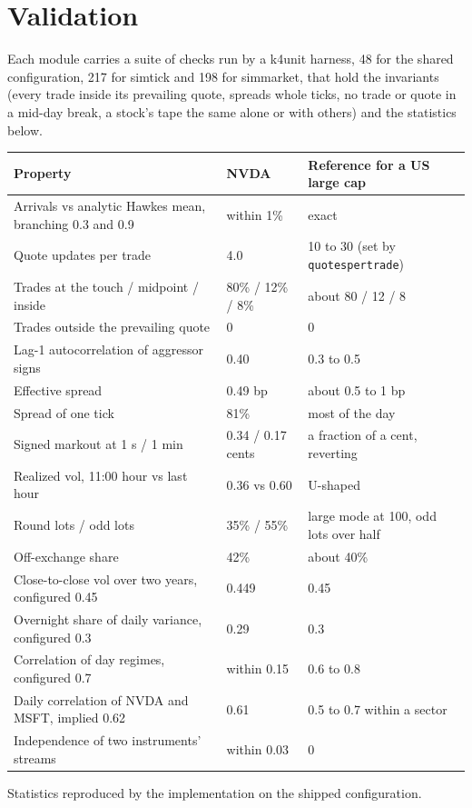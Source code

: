 \documentclass[11pt,a4paper]{article}
\newcommand{\key}[1]{\texttt{#1}}
\theoremstyle{paper}
\begin{document}
\section{Validation}

Each module carries a suite of checks run by a k4unit harness, 48 for the shared configuration, 217 for simtick and 198 for simmarket, that hold the invariants (every trade inside its prevailing quote, spreads whole ticks, no trade or quote in a mid-day break, a stock's tape the same alone or with others) and the statistics below.

\begin{center}
\small
\begin{tabularx}{\linewidth}{@{}Xll@{}}
\toprule
\textbf{Property} & \textbf{NVDA} & \textbf{Reference for a US large cap}\\
\midrule
Arrivals vs analytic Hawkes mean, branching 0.3 and 0.9 & within 1\% & exact\\
Quote updates per trade & 4.0 & 10 to 30 (set by \key{quotespertrade})\\
Trades at the touch / midpoint / inside & 80\% / 12\% / 8\% & about 80 / 12 / 8\\
Trades outside the prevailing quote & 0 & 0\\
Lag-1 autocorrelation of aggressor signs & 0.40 & 0.3 to 0.5\\
Effective spread & 0.49 bp & about 0.5 to 1 bp\\
Spread of one tick & 81\% & most of the day\\
Signed markout at 1 s / 1 min & 0.34 / 0.17 cents & a fraction of a cent, reverting\\
Realized vol, 11:00 hour vs last hour & 0.36 vs 0.60 & U-shaped\\
Round lots / odd lots & 35\% / 55\% & large mode at 100, odd lots over half\\
Off-exchange share & 42\% & about 40\%\\
Close-to-close vol over two years, configured 0.45 & 0.449 & 0.45\\
Overnight share of daily variance, configured 0.3 & 0.29 & 0.3\\
Correlation of day regimes, configured 0.7 & within 0.15 & 0.6 to 0.8\\
Daily correlation of NVDA and MSFT, implied 0.62 & 0.61 & 0.5 to 0.7 within a sector\\
Independence of two instruments' streams & within 0.03 & 0\\
\bottomrule
\end{tabularx}

\smallskip
Statistics reproduced by the implementation on the shipped configuration.
\end{center}
\end{document}

